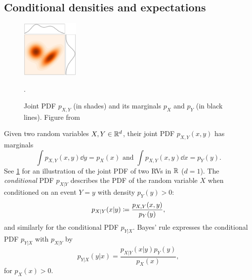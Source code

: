 %


\subsection{Conditional densities and expectations} \label{sec:conditional_densities_and_expectations}
%
\begin{figure}
  \vspace{-40pt}
  \begin{center}
\includegraphics[width=0.25\textwidth]{figures/joints.png}
  \end{center}
  \caption{Joint PDF $p_{X,Y}$ (in shades) and its marginals $p_X$ and $p_Y$ (in black lines). Figure from \citep{lipman2024flow}}.
  \label{fig:joint}
\end{figure}

Given two random variables $X,Y\in \mathbb R^d$, their joint PDF $p_{X,Y}(x,y)$ has marginals 
%
\begin{equation}\label{e:marginals}
 \int p_{X,Y}(x,y)\dd y = p_X(x) \text{ and } \int p_{X,Y}(x,y)\dd x = p_Y(y). 
\end{equation}
See \cref{fig:joint} for an illustration of the joint PDF of two RVs in $\mathbb R$ ($d=1$). 
%
%
The \emph{conditional} PDF $p_{X|Y}$ describes the PDF of the random variable $X$ when conditioned on an event $Y=y$ with density $p_Y(y)>0$:
%
\begin{equation}\label{e:conditional}
    p_{X|Y}(x|y)\coloneqq\frac{p_{X,Y}(x,y)}{p_Y(y)},
\end{equation} 
%
and similarly for the conditional PDF $p_{Y|X}$. Bayes' rule expresses the conditional PDF $p_{Y|X}$ with $p_{X|Y}$ by
\begin{equation}
    p_{Y|X}(y|x) = \frac{p_{X|Y}(x|y)p_Y(y)}{p_X(x)},
\end{equation}
for $p_X(x)>0$. 
%

